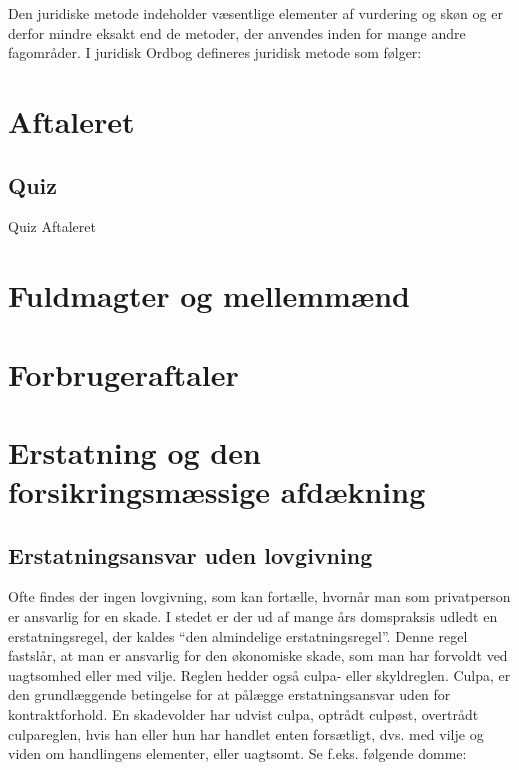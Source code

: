\documentclass[]{book}
\begin{document}
Den juridiske metode indeholder væsentlige elementer af vurdering og skøn og er derfor mindre eksakt end de metoder, der anvendes inden for mange andre fagområder.
I juridisk Ordbog defineres juridisk metode som følger:

\hypertarget{aftaleret}{%
\chapter{Aftaleret}\label{aftaleret}}

\hypertarget{quiz}{%
\section{Quiz}\label{quiz}}

Quiz Aftaleret

\hypertarget{fuldmagter-og-mellemmnd}{%
\chapter{Fuldmagter og mellemmænd}\label{fuldmagter-og-mellemmnd}}

\hypertarget{forbrugeraftaler}{%
\chapter{Forbrugeraftaler}\label{forbrugeraftaler}}

\hypertarget{erstatning-og-den-forsikringsmssige-afdkning}{%
\chapter{Erstatning og den forsikringsmæssige afdækning}\label{erstatning-og-den-forsikringsmssige-afdkning}}

\hypertarget{erstatningsansvar-uden-lovgivning}{%
\section{Erstatningsansvar uden lovgivning}\label{erstatningsansvar-uden-lovgivning}}

Ofte findes der ingen lovgivning, som kan fortælle, hvornår man som privatperson er ansvarlig for en skade. I stedet er der ud af mange års domspraksis udledt en erstatningsregel, der kaldes ``den almindelige erstatningsregel''. Denne regel fastslår, at man er ansvarlig for den økonomiske skade, som man har forvoldt ved uagtsomhed eller med vilje. Reglen hedder også culpa- eller skyldreglen. Culpa, er den grundlæggende betingelse for at pålægge erstatningsansvar uden for kontraktforhold. En skadevolder har udvist culpa, optrådt culpøst, overtrådt culpareglen, hvis han eller hun har handlet enten forsætligt, dvs. med vilje og viden om handlingens elementer, eller uagtsomt. Se f.eks. følgende domme:
\end{document}
